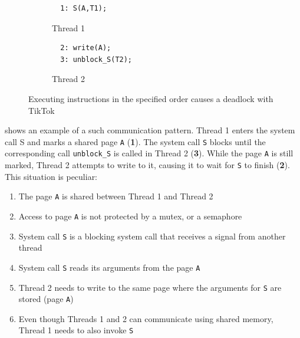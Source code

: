 \begin{figure}
  \centering
  \begin{subfigure}[b]{0.45\linewidth}
  \begin{minipage}{\linewidth}
  \begin{lstlisting}
  1: S(A,T1);  
  \end{lstlisting}
  \end{minipage}
  \caption{Thread 1}
  \end{subfigure}
  \hfill
  \begin{subfigure}[b]{0.45\linewidth}
  \begin{minipage}{\linewidth}
  \begin{lstlisting}
  2: write(A);
  3: unblock_S(T2);
  \end{lstlisting}  
  \end{minipage}
  \caption{Thread 2}
  \end{subfigure}
  \caption{Executing instructions in the specified order causes a deadlock with TikTok}
  \label{fig:deadlock}
\end{figure}


 shows an example of a such communication pattern. Thread 1
enters the system call S and marks a shared page \texttt{A} (\textbf{1}). The
system call \texttt{S} blocks until the corresponding call \texttt{unblock\_S} is called
in Thread 2 (\textbf{3}). While the page \texttt{A} is still marked, Thread 2
attempts to write to it, causing it to wait for \texttt{S} to finish
(\textbf{2}). This situation is peculiar:

\begin{enumerate}
    \item The page \texttt{A} is shared between Thread 1 and Thread 2
    \item Access to page \texttt{A} is not protected by a mutex, or a semaphore
    \item System call \texttt{S} is a blocking system call that receives a 
    signal from another thread
    \item System call \texttt{S} reads its arguments from the page \texttt{A}
    \item Thread 2 needs to write to the same page where the arguments for 
    \texttt{S} are stored (page \texttt{A})
    \item Even though Threads 1 and 2 can communicate using shared memory, 
    Thread 1 needs to also invoke \texttt{S}
\end{enumerate}

